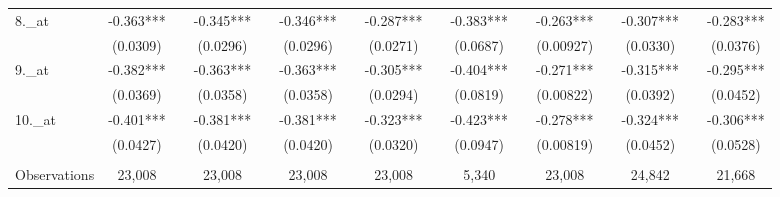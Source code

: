 \documentclass[a4paper, 12pt]{article}
\begin{document}
\begin{table}[H]
\begin{adjustbox}{max width=\textwidth}
\begin{tabular}{llllllllllllllll}
    8.\_at & \multicolumn{1}{c}{-0.363***} &       & \multicolumn{1}{c}{-0.345***} &       & \multicolumn{1}{c}{-0.346***} &       & \multicolumn{1}{c}{-0.287***} &       & \multicolumn{1}{c}{-0.383***} &       & \multicolumn{1}{c}{-0.263***} &       & \multicolumn{1}{c}{-0.307***} &       & \multicolumn{1}{c}{-0.283***} \\
          & \multicolumn{1}{c}{(0.0309)} &       & \multicolumn{1}{c}{(0.0296)} &       & \multicolumn{1}{c}{(0.0296)} &       & \multicolumn{1}{c}{(0.0271)} &       & \multicolumn{1}{c}{(0.0687)} &       & \multicolumn{1}{c}{(0.00927)} &       & \multicolumn{1}{c}{(0.0330)} &       & \multicolumn{1}{c}{(0.0376)} \\
    9.\_at & \multicolumn{1}{c}{-0.382***} &       & \multicolumn{1}{c}{-0.363***} &       & \multicolumn{1}{c}{-0.363***} &       & \multicolumn{1}{c}{-0.305***} &       & \multicolumn{1}{c}{-0.404***} &       & \multicolumn{1}{c}{-0.271***} &       & \multicolumn{1}{c}{-0.315***} &       & \multicolumn{1}{c}{-0.295***} \\
          & \multicolumn{1}{c}{(0.0369)} &       & \multicolumn{1}{c}{(0.0358)} &       & \multicolumn{1}{c}{(0.0358)} &       & \multicolumn{1}{c}{(0.0294)} &       & \multicolumn{1}{c}{(0.0819)} &       & \multicolumn{1}{c}{(0.00822)} &       & \multicolumn{1}{c}{(0.0392)} &       & \multicolumn{1}{c}{(0.0452)} \\
   10.\_at & \multicolumn{1}{c}{-0.401***} &       & \multicolumn{1}{c}{-0.381***} &       & \multicolumn{1}{c}{-0.381***} &       & \multicolumn{1}{c}{-0.323***} &       & \multicolumn{1}{c}{-0.423***} &       & \multicolumn{1}{c}{-0.278***} &       & \multicolumn{1}{c}{-0.324***} &       & \multicolumn{1}{c}{-0.306***} \\
          & \multicolumn{1}{c}{(0.0427)} &       & \multicolumn{1}{c}{(0.0420)} &       & \multicolumn{1}{c}{(0.0420)} &       & \multicolumn{1}{c}{(0.0320)} &       & \multicolumn{1}{c}{(0.0947)} &       & \multicolumn{1}{c}{(0.00819)} &       & \multicolumn{1}{c}{(0.0452)} &       & \multicolumn{1}{c}{(0.0528)} \\
          & \multicolumn{1}{c}{} &       & \multicolumn{1}{c}{} &       & \multicolumn{1}{c}{} &       & \multicolumn{1}{c}{} &       &       &       &       &       &       &       &  \\
    Observations & \multicolumn{1}{c}{23,008} &       & \multicolumn{1}{c}{23,008} &       & \multicolumn{1}{c}{23,008} &       & \multicolumn{1}{c}{23,008} &       & \multicolumn{1}{c}{5,340} &       & \multicolumn{1}{c}{23,008} &       & \multicolumn{1}{c}{24,842} &       & \multicolumn{1}{c}{21,668} \\

\end{tabular}
\end{adjustbox}
\end{table}
\end{document}

